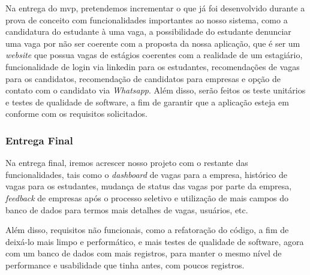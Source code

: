 Na entrega do \ac{mvp}, pretendemos incrementar o que já foi desenvolvido durante a prova de conceito com funcionalidades importantes ao nosso sistema, como a candidatura do estudante à uma vaga, a possibilidade do estudante denunciar uma vaga por não ser coerente com a proposta da nossa aplicação, que é ser um \emph{website} que possua vagas de estágios coerentes com a realidade de um estagiário, funcionalidade de login via \gls{linkedin} para os estudantes, recomendações de vagas para os candidatos, recomendação de candidatos para empresas e opção de contato com o candidato via \emph{Whatsapp}. Além disso, serão feitos os teste unitários e testes de qualidade de software, a fim de garantir que a aplicação esteja em conforme com os requisitos solicitados.

\subsubsection{Entrega Final}

Na entrega final, iremos acrescer nosso projeto com o restante das funcionalidades, tais como o \emph{dashboard} de vagas para a empresa, histórico de vagas para os estudantes, mudança de status das vagas por parte da empresa, \emph{feedback} de empresas após o processo seletivo e utilização de mais campos do banco de dados para termos mais detalhes de vagas, usuários, etc.

Além disso, requisitos não funcionais, como a refatoração do código, a fim de deixá-lo mais limpo e performático, e mais testes de qualidade de software, agora com um banco de dados com mais registros, para manter o mesmo nível de performance e usabilidade que tinha antes, com poucos registros.
